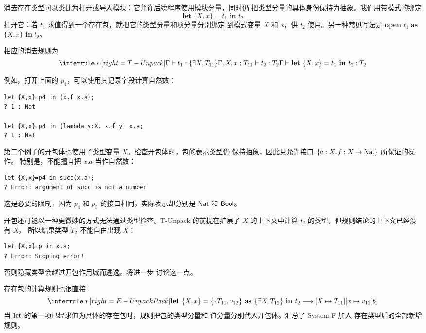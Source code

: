 消去存在类型可以类比为打开或导入模块：它允许后续程序使用模块分量，同时仍
把类型分量的具体身份保持为抽象。我们用带模式的绑定
\[
\textbf{let }\{X,x\}=t_1\textbf{ in }t_2
\]
打开它：若 \(t_1\) 求值得到一个存在包，就把它的类型分量和项分量分别绑定
到模式变量 \(X\) 和 \(x\)，供 \(t_2\) 使用。另一种常见写法是
\textbf{open} \(t_1\) \textbf{as} \(\{X,x\}\) \textbf{in} \(t_2\)。

相应的消去规则为
\[
\inferrule*[right=T-Unpack]
 {\Gamma\vdash t_1:\{\exists X,T_{11}\}\\
  \Gamma,X,x:T_{11}\vdash t_2:T_2}
 {\Gamma\vdash\textbf{let }\{X,x\}=t_1\textbf{ in }t_2:T_2}
\]

例如，打开上面的 \(p_4\)，可以使用其记录字段计算自然数：
\begin{lstlisting}
let {X,x}=p4 in (x.f x.a);
? 1 : Nat

let {X,x}=p4 in (lambda y:X. x.f y) x.a;
? 1 : Nat
\end{lstlisting}
第二个例子的开包体也使用了类型变量 \(X\)。检查开包体时，包的表示类型仍
保持抽象，因此只允许接口 \(\{a:X,f:X\to\mathsf{Nat}\}\) 所保证的操作。
特别是，不能擅自把 \(x.a\) 当作自然数：
\begin{lstlisting}
let {X,x}=p4 in succ(x.a);
? Error: argument of succ is not a number
\end{lstlisting}
这是必要的限制，因为 \(p_4\) 和 \(p_5\) 的接口相同，实际表示却分别是
\(\mathsf{Nat}\) 和 \(\mathsf{Bool}\)。

开包还可能以一种更微妙的方式无法通过类型检查。T-Unpack 的前提在扩展了
\(X\) 的上下文中计算 \(t_2\) 的类型，但规则结论的上下文已经没有 \(X\)，
所以结果类型 \(T_2\) 不能自由出现 \(X\)：
\begin{lstlisting}
let {X,x}=p in x.a;
? Error: Scoping error!
\end{lstlisting}
否则隐藏类型会越过开包作用域而逃逸。将进一步
讨论这一点。

存在包的计算规则也很直接：
\[
\inferrule*[right=E-UnpackPack]{ }
 {\textbf{let }\{X,x\}=
  \{*T_{11},v_{12}\}\textbf{ as }\{\exists X,T_{12}\}
  \textbf{ in }t_2
  \longrightarrow
  [X\mapsto T_{11}][x\mapsto v_{12}]t_2}
\]
当 \textbf{let} 的第一项已经求值为具体的存在包时，规则把包的类型分量和
值分量分别代入开包体。汇总了 System F 加入
存在类型后的全部新增规则。

